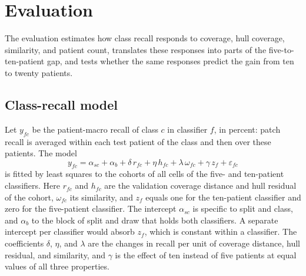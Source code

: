 \documentclass[11pt]{article}
\begin{document}
\section{Evaluation}
\label{sec:evaluation}
The evaluation estimates how class recall responds to coverage, hull coverage, similarity, and patient count, translates these responses into parts of the five-to-ten-patient gap, and tests whether the same responses predict the gain from ten to twenty patients.

\subsection{Class-recall model}
\label{sec:model}
Let $y_{fc}$ be the patient-macro recall of class $c$ in classifier $f$, in percent: patch recall is averaged within each test patient of the class and then over these patients. The model
\begin{equation}
 y_{fc}=\alpha_{sc}+\alpha_{b}+\delta\,r_{fc}+\eta\,h_{fc}+\lambda\,\omega_{fc}+\gamma\,z_{f}+\varepsilon_{fc}
 \label{eq:model}
\end{equation}
\noindent is fitted by least squares to the cohorts of all cells of the five- and ten-patient classifiers. Here $r_{fc}$ and $h_{fc}$ are the validation coverage distance and hull residual of the cohort, $\omega_{fc}$ its similarity, and $z_f$ equals one for the ten-patient classifier and zero for the five-patient classifier. The intercept $\alpha_{sc}$ is specific to split and class, and $\alpha_b$ to the block of split and draw that holds both classifiers. A separate intercept per classifier would absorb $z_f$, which is constant within a classifier. The coefficients $\delta$, $\eta$, and $\lambda$ are the changes in recall per unit of coverage distance, hull residual, and similarity, and $\gamma$ is the effect of ten instead of five patients at equal values of all three properties.
\end{document}
